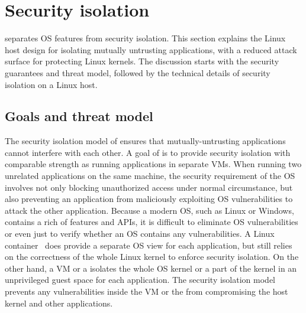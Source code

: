 \section{Security isolation}
\label{sec:linux:security}

\graphene{} separates OS features from security isolation.
This section explains the Linux host design for isolating mutually untrusting applications, with a reduced attack surface for protecting Linux kernels.
The discussion starts with the security guarantees and threat model, followed by the technical details of security isolation on a Linux host.



\subsection{Goals and threat model}

The security isolation model of \graphene{} ensures that mutually-untrusting applications cannot interfere with each other.
A goal of \graphene{} is to provide security isolation with comparable strength as
running applications in separate VMs.
When running two unrelated applications on the same machine,
the security requirement
of the OS involves not only blocking unauthorized access under normal circumstance,
but also preventing an application
from maliciously exploiting OS vulnerabilities to attack the other application.
Because a modern OS, such as Linux or Windows, contains a rich of features and APIs,
it is difficult to eliminate OS vulnerabilities
or even just to verify whether an OS contains any vulnerabilities. 
A Linux container~\cite{lxc}
does provide a separate OS view for each application,
but still relies on the correctness of the whole Linux kernel to enforce security isolation.
On the other hand, a VM or a \libos{}
isolates the whole OS kernel or a part of the kernel in an unprivileged guest space
for each application.
The security isolation model prevents
any vulnerabilities inside the VM or the \libos{} from compromising the host kernel and other applications.



